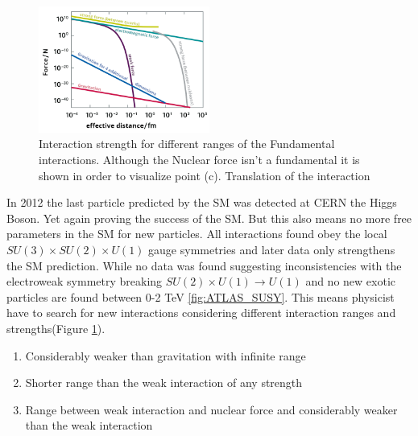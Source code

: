 \documentclass[../Bachelorarbeit.tex]{subfiles}
\begin{document}
\label{sec:BSM}
\begin{figure}
    \centering
    \includegraphics[width=0.5\textwidth]{images/Teilchenwet_WW_range.png}
    \caption{Interaction strength for different ranges of the Fundamental interactions. Although the Nuclear force isn't a fundamental it is shown in order to visualize point (c). Translation of the interaction }
    \label{fig:WW_range}
\end{figure}

In 2012 the last particle predicted by the SM was detected at CERN the Higgs Boson. Yet again proving the success of the SM.
But this also means no more free parameters in the SM for new particles. All interactions found obey the local $SU(3) \times SU(2) \times U(1)$ gauge symmetries
and later data only strengthens the SM prediction. While no data was found suggesting inconsistencies with the electroweak symmetry breaking $SU(2) \times U(1) \rightarrow U(1)$
and no new exotic particles are found between 0-2 TeV \ref{fig:ATLAS_SUSY}.
This means physicist have to search for new interactions considering different interaction ranges and strengths(Figure \ref{fig:WW_range}).
\begin{enumerate}[label=(\alph*)]
    \item Considerably weaker than gravitation with infinite range
    \item Shorter range than the weak interaction of any strength
    \item Range between weak interaction and nuclear force and considerably weaker than the weak interaction 
\end{enumerate}
\end{document}
